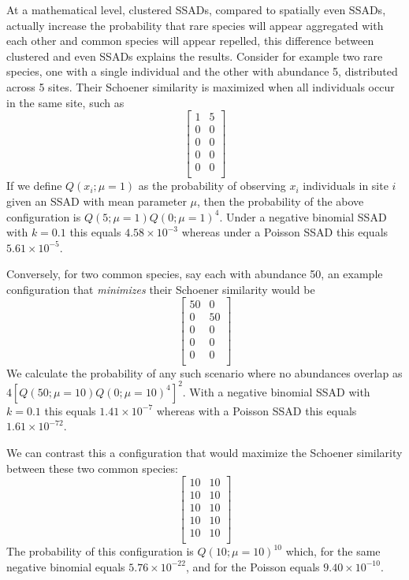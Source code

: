 \documentclass[]{article}
\begin{document}
At a mathematical level, clustered SSADs, compared to spatially even
SSADs, actually increase the probability that rare species will appear
aggregated with each other and common species will appear repelled, this
difference between clustered and even SSADs explains the results.
Consider for example two rare species, one with a single individual and
the other with abundance 5, distributed across 5 sites. Their Schoener
similarity is maximized when all individuals occur in the same site,
such as \[
\begin{bmatrix} 1 & 5 \\ 0 & 0 \\ 0 & 0 \\ 0 & 0 \\ 0 & 0 \\ \end{bmatrix}
\] If we define \(Q(x_i; \mu = 1)\) as the probability of observing
\(x_i\) individuals in site \(i\) given an SSAD with mean parameter
\(\mu\), then the probability of the above configuration is
\(Q(5; \mu = 1) Q(0; \mu = 1)^4\). Under a negative binomial SSAD with
\(k = 0.1\) this equals \(4.58 \times 10^{-3}\) whereas under a Poisson
SSAD this equals \(5.61 \times 10^{-5}\).

Conversely, for two common species, say each with abundance 50, an
example configuration that \emph{minimizes} their Schoener similarity
would be \[
\begin{bmatrix} 50 & 0 \\ 0 & 50 \\ 0 & 0 \\ 0 & 0 \\ 0 & 0 \\ \end{bmatrix}
\] We calculate the probability of any such scenario where no abundances
overlap as \(4 [Q(50; \mu = 10) Q(0; \mu = 10)^{4}]^2\). With a negative
binomial SSAD with \(k = 0.1\) this equals \(1.41 \times 10^{-7}\)
whereas with a Poisson SSAD this equals \(1.61 \times 10^{-72}\).

We can contrast this a configuration that would maximize the Schoener
similarity between these two common species: \[
\begin{bmatrix} 10 & 10 \\ 10 & 10 \\ 10 & 10 \\ 10 & 10 \\ 10 & 10 \\ \end{bmatrix}
\] The probability of this configuration is \(Q(10; \mu = 10)^{10}\)
which, for the same negative binomial equals \(5.76 \times 10^{-22}\),
and for the Poisson equals \(9.40 \times 10^{-10}\).
\end{document}
